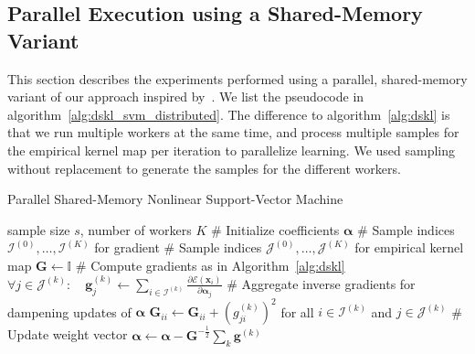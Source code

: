 \documentclass{article} %
\newcommand{\va}{\boldsymbol{\alpha}}
\renewcommand{\vec}[1]{\mathbf{#1}}
\begin{document}
 \subsection{Parallel Execution using a Shared-Memory Variant}\label{sec:distributed}
This section describes the experiments performed using a parallel, shared-memory variant of our approach inspired by~\cite{Agarwal2014}. We list the pseudocode in algorithm~\autoref{alg:dskl_svm_distributed}. The difference to algorithm~\autoref{alg:dskl} is that we run multiple workers at the same time, and process multiple samples for the empirical kernel map per iteration to parallelize learning. We used sampling without replacement to generate the samples for the different workers. 

 \begin{algorithm}
   \begin{algorithmic}[1]
     \caption{Parallel Shared-Memory Nonlinear Support-Vector Machine\label{alg:dskl_svm_distributed}}
       \REQUIRE sample size $s$, number of workers $K$
       \STATE \# Initialize coefficients $\va$
       \STATE \# Sample indices $\mathcal{I}^{(0)},\dots,\mathcal{I}^{(K)}$ for gradient 
       \STATE \# Sample indices $\mathcal{J}^{(0)},\dots,\mathcal{J}^{(K)}$ for empirical kernel map 
       \STATE $\vec{G} \leftarrow \mathbb{I}$
             \STATE \# Compute gradients as in Algorithm~\autoref{alg:dskl}
             \STATE $\forall j \in \mathcal{J}^{(k)}: \quad \vec{g}^{(k)}_{j} \gets \sum_{i\in\mathcal{I}^{(k)}}\frac{\partial \mathcal{E}(\vec{x}_i)}{\partial\va_{j}}$
             \STATE \# Aggregate inverse gradients for dampening updates of $\va$
             \STATE $\vec{G}_{ii} \leftarrow \vec{G}_{ii} + \left(g^{(k)}_{ji}\right)^2$ for all $i \in\mathcal{I}^{(k)}$ and $j\in\mathcal{J}^{(k)}$
           \ENDFOR
         \ENDFOR
         \STATE \# Update weight vector 
         \STATE $\va \leftarrow \va - \vec{G}^{-\frac{1}{2}} \sum_k \vec{g}^{(k)}$
       \ENDWHILE
   \end{algorithmic}
 \end{algorithm}
\end{document}
